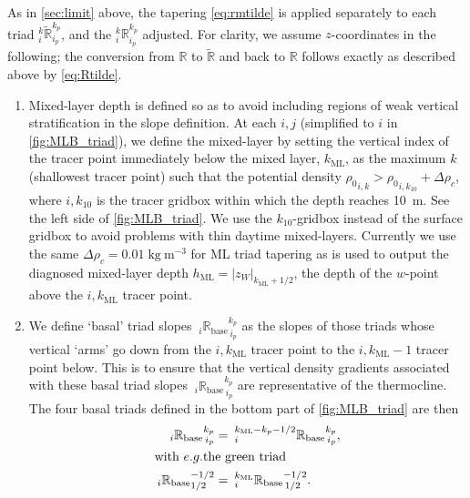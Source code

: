 \documentclass[../main/NEMO_manual]{subfiles}
\begin{document}
As in \autoref{sec:limit} above, the tapering \autoref{eq:rmtilde} is applied separately to
each triad $_i^k\tilde{\mathbb{R}}_{i_p}^{k_p}$, and the $_i^k\mathbb{R}_{i_p}^{k_p}$ adjusted.
For clarity, we assume $z$-coordinates in the following;
the conversion from $\mathbb{R}$ to $\tilde{\mathbb{R}}$ and back to $\mathbb{R}$ follows exactly as
described above by \autoref{eq:Rtilde}.
\begin{enumerate}
\item
  Mixed-layer depth is defined so as to avoid including regions of weak vertical stratification in
  the slope definition.
  At each $i,j$ (simplified to $i$ in \autoref{fig:MLB_triad}),
  we define the mixed-layer by setting the vertical index of the tracer point immediately below the mixed layer,
  $k_{\mathrm{ML}}$, as the maximum $k$ (shallowest tracer point) such that
  the potential density ${\rho_0}_{i,k}>{\rho_0}_{i,k_{10}}+\Delta\rho_c$,
  where $i,k_{10}$ is the tracer gridbox within which the depth reaches 10~m.
  See the left side of \autoref{fig:MLB_triad}.
  We use the $k_{10}$-gridbox instead of the surface gridbox to avoid problems \eg with thin daytime mixed-layers.
  Currently we use the same $\Delta\rho_c=0.01\;\mathrm{kg\:m^{-3}}$ for ML triad tapering as is used to
  output the diagnosed mixed-layer depth $h_{\mathrm{ML}}=|z_{W}|_{k_{\mathrm{ML}}+1/2}$,
  the depth of the $w$-point above the $i,k_{\mathrm{ML}}$ tracer point.
\item
  We define `basal' triad slopes ${\:}_i{\mathbb{R}_{\mathrm{base}}}_{\,i_p}^{k_p}$ as
  the slopes of those triads whose vertical `arms' go down from the $i,k_{\mathrm{ML}}$ tracer point to
  the $i,k_{\mathrm{ML}}-1$ tracer point below.
  This is to ensure that the vertical density gradients associated with
  these basal triad slopes ${\:}_i{\mathbb{R}_{\mathrm{base}}}_{\,i_p}^{k_p}$ are representative of the thermocline.
  The four basal triads defined in the bottom part of \autoref{fig:MLB_triad} are then
  \begin{align*}
    {\:}_i{\mathbb{R}_{\mathrm{base}}}_{\,i_p}^{k_p} &=
                                                       {\:}^{k_{\mathrm{ML}}-k_p-1/2}_i{\mathbb{R}_{\mathrm{base}}}_{\,i_p}^{k_p},
    \\
    \intertext{with \ensuremath{e.g.}the green triad}
    {\:}_i{\mathbb{R}_{\mathrm{base}}}_{1/2}^{-1/2}&=
                                                     {\:}^{k_{\mathrm{ML}}}_i{\mathbb{R}_{\mathrm{base}}}_{\,1/2}^{-1/2}.
  \end{align*}

\end{enumerate}
\end{document}
